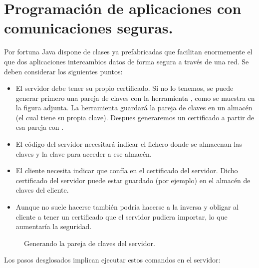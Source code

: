 \documentclass[letterpaper,10pt,spanish]{sphinxmanual}
\begin{document}
\section{Programación de aplicaciones con comunicaciones seguras.}
\label{\detokenize{textos/tema5:programacion-de-aplicaciones-con-comunicaciones-seguras}}
Por fortuna Java dispone de clases ya prefabricadas que facilitan enormemente el que dos aplicaciones intercambios datos de forma segura a través de una red. Se deben considerar los siguientes puntos:
\begin{itemize}
\item {} 
El servidor debe tener su propio certificado. Si no lo tenemos, se puede generar primero una pareja de claves con la herramienta , como se muestra en la figura adjunta. La herramienta guardará la pareja de claves en un almacén (el cual tiene su propia clave). Despues generaremos un certificado a partir de esa pareja con .

\item {} 
El código del servidor necesitará indicar el fichero donde se almacenan las claves y la clave para acceder a ese almacén.

\item {} 
El cliente necesita indicar que confía en el certificado del servidor. Dicho certificado del servidor puede estar guardado (por ejemplo) en el almacén de claves del cliente.

\item {} 
Aunque no suele hacerse también podría hacerse a la inversa y obligar al cliente a tener un certificado que el servidor pudiera importar, lo que aumentaría la seguridad.

\end{itemize}

\begin{figure}[htbp]
\centering
\capstart

\noindent{}
\caption{Generando la pareja de claves del servidor.}\label{\detokenize{textos/tema5:id2}}\end{figure}

Los pasos desglosados implican ejecutar estos comandos en el servidor:
\end{document}
